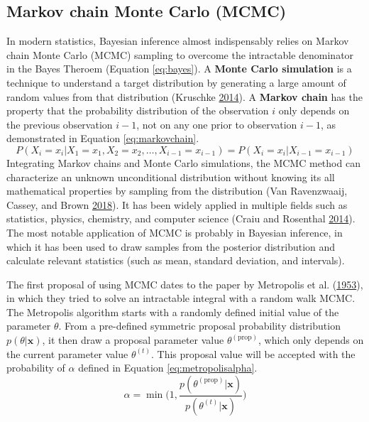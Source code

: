\documentclass[12pt]{book}
\numberwithin{equation}{chapter}
\begin{document}
\hypertarget{markov-chain-monte-carlo-mcmc}{%
\subsection{Markov chain Monte Carlo (MCMC)}\label{markov-chain-monte-carlo-mcmc}}

In modern statistics, Bayesian inference almost indispensably relies on Markov chain Monte Carlo (MCMC) sampling to overcome the intractable denominator in the Bayes Theroem (Equation \eqref{eq:bayes}). A \textbf{Monte Carlo simulation} is a technique to understand a target distribution by generating a large amount of random values from that distribution (Kruschke \protect\hyperlink{ref-kruschke2014doing}{2014}). A \textbf{Markov chain} has the property that the probability distribution of the observation \(i\) only depends on the previous observation \(i-1\), not on any one prior to observation \(i-1\), as demonstrated in Equation \eqref{eq:markovchain}.
\begin{equation}
P\left(X_{i}=x_{i} | X_{1}=x_{1}, X_{2}=x_{2}, \ldots, X_{i-1}=x_{i-1}\right) = P\left(X_{i}=x_{i} | X_{i-1}=x_{i-1}\right)
\label{eq:markovchain}
\end{equation}
Integrating Markov chains and Monte Carlo simulations, the MCMC method can characterize an unknown unconditional distribution without knowing its all mathematical properties by sampling from the distribution (Van Ravenzwaaij, Cassey, and Brown \protect\hyperlink{ref-van2018simple}{2018}). It has been widely applied in multiple fields such as statistics, physics, chemistry, and computer science (Craiu and Rosenthal \protect\hyperlink{ref-craiu2014bayesian}{2014}). The most notable application of MCMC is probably in Bayesian inference, in which it has been used to draw samples from the posterior distribution and calculate relevant statistics (such as mean, standard deviation, and intervals).

The first proposal of using MCMC dates to the paper by Metropolis et al. (\protect\hyperlink{ref-metropolis1953equation}{1953}), in which they tried to solve an intractable integral with a random walk MCMC. The Metropolis algorithm starts with a randomly defined initial value of the parameter \(\theta\). From a pre-defined symmetric proposal probability distribution \(p(\theta | \mathbf{x})\), it then draw a proposal parameter value \(\theta^{(\text{prop})}\), which only depends on the current parameter value \(\theta^{(t)}\). This proposal value will be accepted with the probability of \(\alpha\) defined in Equation \eqref{eq:metropolisalpha}.
\begin{equation}
\alpha = \min\bigg(1, \frac{p(\theta^{(\text{prop})}|\mathbf{x})}{p(\theta^{(t)}|\mathbf{x})}\bigg)
\label{eq:metropolisalpha}
\end{equation}
\end{document}

